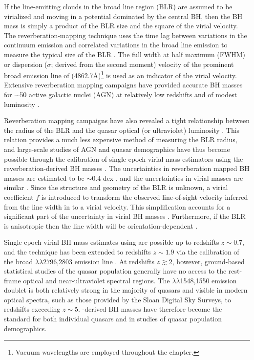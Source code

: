 If the line-emitting clouds in the broad line region (BLR) are assumed to be virialized and moving in a potential dominated by the central BH, then the BH mass is simply a product of the BLR size and the square of the virial velocity.
The reverberation-mapping technique uses the time lag between variations in the continuum emission and correlated variations in the broad line emission to measure the typical size of the BLR \citep{peterson93,peterson14}. 
The full width at half maximum (FWHM) or dispersion ($\sigma$; derived from the second moment) velocity of the prominent broad emission line of \hb (4862.7\AA)\footnote{Vacuum wavelengths are employed throughout the chapter.} is used as an indicator of the virial velocity.
Extensive reverberation mapping campaigns have provided accurate BH masses for $\sim$50 active galactic nuclei (AGN) at relatively low redshifts and of modest luminosity \citep[e.g.][]{kaspi00,kaspi07,peterson04,bentz09,denney10}. 

Reverberation mapping campaigns have also revealed a tight relationship between the radius of the BLR and the quasar optical (or ultraviolet) luminosity \citep[the $R-L$ relation; e.g.][]{kaspi00,kaspi07}.
This relation provides a much less expensive method of measuring the BLR radius, and large-scale studies of AGN and quasar demographics have thus become possible through the calibration of single-epoch virial-mass estimators using the reverberation-derived BH masses \citep[e.g.][]{greene05,vestergaard06,vestergaard09,shen11,shen12,trakhtenbrot12}.
The uncertainties in reverberation mapped BH masses are estimated to be $\sim 0.4$ dex \citep[e.g.][]{peterson10}, and the uncertainties in virial masses are similar \citep[e.g.][]{vestergaard06}.
Since the structure and geometry of the BLR is unknown, a virial coefficient $f$ is introduced to transform the observed line-of-sight velocity inferred from the line width in to a virial velocity.
This simplification accounts for a significant part of the uncertainty in virial BH masses \citep[in addition to, for example, describing the BLR with a single radius $R$ and scatter in the $R-L$ relation;][]{shen13}. 
Furthermore, if the BLR is anisotropic \citep[for example, in a flattened disk; e.g.][]{jarvis06} then the line width will be orientation-dependent \citep[e.g.][]{runnoe13b,shen14,brotherton15}. 

Single-epoch virial BH mass estimates using \hb are possible up to redshifts $z\sim0.7$, and the technique has been extended to redshifts $z\sim1.9$ via the calibration of the broad $\lambda\lambda$2796,2803 emission line \citep{mclure02,onken08,wang09,rafiee11}. 
At redshifts $z\gtrsim2$, however, ground-based statistical studies of the quasar population generally have no access to the rest-frame optical and near-ultraviolet spectral regions.
The $\lambda\lambda$1548,1550 emission doublet is both relatively strong in the majority of quasars and visible in modern optical spectra, such as those provided by the Sloan Digital Sky Surveys, to redshifts exceeding $z\sim5$. 
-derived BH masses have therefore become the standard \citep[e.g.][]{vestergaard06,park13} for both individual quasars and in studies of quasar population demographics.

